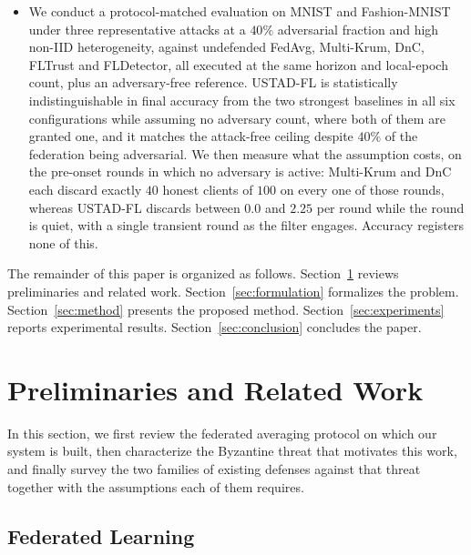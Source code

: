 \documentclass[journal]{IEEEtran}
\begin{document}
\begin{itemize}
    \item We conduct a protocol-matched evaluation on MNIST and Fashion-MNIST under three representative attacks at a $40\%$ adversarial fraction and high non-IID heterogeneity, against undefended FedAvg, Multi-Krum, DnC, FLTrust and FLDetector, all executed at the same horizon and local-epoch count, plus an adversary-free reference. USTAD-FL is statistically indistinguishable in final accuracy from the two strongest baselines in all six configurations while assuming no adversary count, where both of them are granted one, and it matches the attack-free ceiling despite $40\%$ of the federation being adversarial. We then measure what the assumption costs, on the pre-onset rounds in which no adversary is active: Multi-Krum and DnC each discard exactly $40$ honest clients of $100$ on every one of those rounds, whereas USTAD-FL discards between $0.0$ and $2.25$ per round while the round is quiet, with a single transient round as the filter engages. Accuracy registers none of this.
\end{itemize}

The remainder of this paper is organized as follows. Section~\ref{sec:preliminaries} reviews preliminaries and related work. Section~\ref{sec:formulation} formalizes the problem. Section~\ref{sec:method} presents the proposed method. Section~\ref{sec:experiments} reports experimental results. Section~\ref{sec:conclusion} concludes the paper.

\section{Preliminaries and Related Work}
\label{sec:preliminaries}

In this section, we first review the federated averaging protocol on which our system is
built, then characterize the Byzantine threat that motivates this work, and finally survey the
two families of existing defenses against that threat together with the assumptions each of
them requires.

\subsection{Federated Learning}
\end{document}
